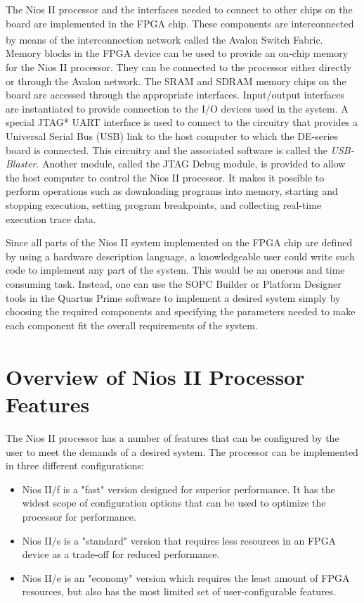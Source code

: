 \documentclass[11pt, twoside, pdftex]{article}
\begin{document}
\newpage
The Nios II processor and the interfaces needed to connect to other chips on the
board are implemented in the FPGA chip. These components are
interconnected by means of the interconnection network called the Avalon\textsuperscript{\textregistered} Switch Fabric.
Memory blocks in the FPGA device can be used to provide an on-chip memory
for the Nios II processor. They can be connected to the processor either directly or
through the Avalon network. The SRAM and SDRAM memory chips on the board
are accessed through the appropriate interfaces. Input/output interfaces are
instantiated to provide connection to the I/O devices used in the system. 
A special JTAG* UART interface is used to connect to the circuitry that provides a 
Universal Serial Bus (USB) link to the host computer to which the DE-series board is connected. 
This circuitry and the associated software is called the {\it USB-Blaster}. 
Another module, called the JTAG Debug module, is provided to allow the host computer 
to control the Nios II processor.
It makes it possible to perform operations such as downloading programs into memory,
starting and stopping execution, setting program breakpoints, and collecting real-time
execution trace data.

Since all parts of the Nios II system implemented on the FPGA chip are defined by
using a hardware description language, a knowledgeable user could write such code
to implement any part of the system. This would be an onerous and time consuming
task. Instead, one can use the SOPC Builder or Platform Designer tools in the Quartus Prime software
to implement a desired system simply by
choosing the required components and specifying the parameters needed to make
each component fit the overall requirements of the system.

\section{Overview of Nios\textsuperscript{\textregistered} II Processor Features}
The Nios II processor has a number of features that can be configured
by the user to meet the demands of a desired system. The processor can be implemented
in three different configurations:
\begin{itemize}
\item Nios II/f is a "fast" version designed for superior performance.
It has the widest scope of configuration options that can be used to optimize
the processor for performance.
\item Nios II/s is a "standard" version that requires less resources in an FPGA
device as a trade-off for reduced performance.
\item Nios II/e is an "economy" version which requires the least amount of FPGA
resources, but also has the most limited set of user-configurable features.
\end{itemize}
 
\end{document}

